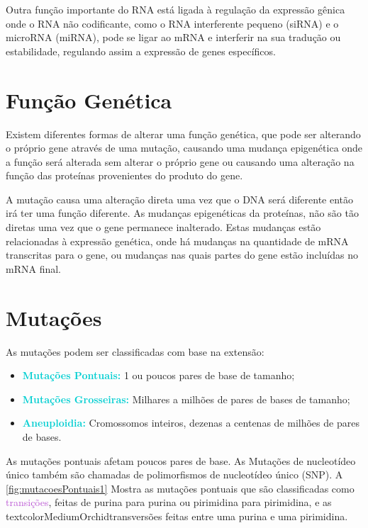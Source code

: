 \documentclass[11pt,a4paper]{article}
\begin{document}
	Outra função importante do RNA está ligada à regulação da expressão gênica onde o RNA não codificante, como o RNA interferente pequeno (siRNA) e o microRNA (miRNA), pode se ligar ao mRNA e interferir na sua tradução ou estabilidade, regulando assim a expressão de genes específicos.



    \section{Função Genética}
      
		Existem diferentes formas de alterar uma função genética, que pode ser alterando o próprio gene através de uma mutação, causando uma mudança epigenética onde a função será alterada sem alterar o próprio gene ou causando uma alteração na função das proteínas provenientes do produto do gene.

		A mutação causa uma alteração direta uma vez que o DNA será diferente então irá ter uma função diferente. As mudanças epigenéticas da proteínas, não são tão diretas uma vez que o gene permanece inalterado. Estas mudanças estão relacionadas à expressão genética, onde há mudanças na quantidade de mRNA transcritas para o gene, ou mudanças nas quais partes do gene estão incluídas no mRNA final.

	\section{Mutações}

		As mutações podem ser classificadas com base na extensão:

			\begin{itemize}
				\item \textcolor{DarkTurquoise}{\textbf{Mutações Pontuais:}}  1 ou poucos pares de base de tamanho;
				\item \textcolor{DarkTurquoise}{\textbf{Mutações Grosseiras:}} Milhares a milhões de pares de bases de tamanho;
				\item \textcolor{DarkTurquoise}{\textbf{Aneuploidia:}} Cromossomos inteiros, dezenas a centenas de milhões de pares de bases.
			\end{itemize}

		As mutações pontuais afetam poucos pares de base. As \textcolor{CarnationPink}{Mutações de nucleotídeo único} também são chamadas de polimorfismos de nucleotídeo único (SNP). A \ref{fig:mutacoesPontuais1} Mostra as mutações pontuais que são classificadas como \textcolor{MediumOrchid}{transições}, feitas de purina para purina ou pirimidina para pirimidina, e as textcolor{MediumOrchid}{transversões} feitas entre uma purina e uma pirimidina. 
		
\end{document}
